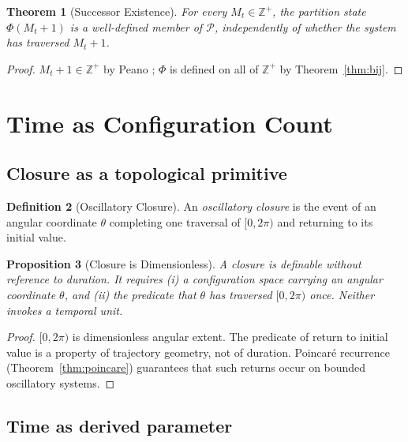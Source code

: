 \documentclass[twocolumn,10pt,a4paper]{article}
\theoremstyle{thmstyle}
\newtheorem{theorem}{Theorem}[section]
\newtheorem{proposition}[theorem]{Proposition}
\theoremstyle{definition}
\newtheorem{definition}[theorem]{Definition}
\theoremstyle{remark}
\newcommand{\Zp}{\mathbb{Z}^{+}}
\newcommand{\Parts}{\mathcal{P}}
\newcommand{\PhiMap}{\varPhi}
\begin{document}
\begin{theorem}[Successor Existence]
\label{thm:succ}
For every $M_{t}\in\Zp$, the partition state $\PhiMap(M_{t}+1)$ is a
well-defined member of $\Parts$, independently of whether the system
has traversed $M_{t}+1$.
\end{theorem}

\begin{proof}
$M_{t}+1\in\Zp$ by Peano \citep{peano1889}; $\PhiMap$ is defined on
all of $\Zp$ by Theorem~\ref{thm:bij}.
\end{proof}

\section{Time as Configuration Count}
\label{sec:timecount}

\subsection{Closure as a topological primitive}

\begin{definition}[Oscillatory Closure]
\label{def:closure}
An \emph{oscillatory closure} is the event of an angular coordinate
$\theta$ completing one traversal of $[0,2\pi)$ and returning to its
initial value.
\end{definition}

\begin{proposition}[Closure is Dimensionless]
\label{prop:closure}
A closure is definable without reference to duration. It requires (i)
a configuration space carrying an angular coordinate $\theta$, and
(ii) the predicate that $\theta$ has traversed $[0,2\pi)$ once.
Neither invokes a temporal unit.
\end{proposition}

\begin{proof}
$[0,2\pi)$ is dimensionless angular extent. The predicate of return
to initial value is a property of trajectory geometry, not of duration.
Poincar\'{e} recurrence (Theorem~\ref{thm:poincare}) guarantees that
such returns occur on bounded oscillatory systems.
\end{proof}

\subsection{Time as derived parameter}
\end{document}
